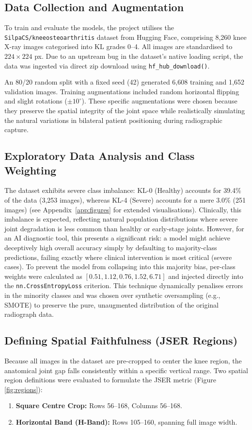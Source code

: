 \documentclass[conference]{IEEEtran}
\begin{document}
\subsection{Data Collection and Augmentation}
To train and evaluate the models, the project utilises the \texttt{SilpaCS/kneeosteoarthritis} \cite{silpacs} dataset from Hugging Face, comprising 8,260 knee X-ray images categorised into KL grades 0--4. All images are standardised to $224 \times 224$ px. Due to an upstream bug in the dataset's native loading script, the data was ingested via direct zip download using \texttt{hf\_hub\_download()}.

An 80/20 random split with a fixed seed (42) generated 6,608 training and 1,652 validation images. Training augmentations included random horizontal flipping and slight rotations ($\pm 10^{\circ}$). These specific augmentations were chosen because they preserve the spatial integrity of the joint space while realistically simulating the natural variations in bilateral patient positioning during radiographic capture.

\subsection{Exploratory Data Analysis and Class Weighting}
The dataset exhibits severe class imbalance: KL-0 (Healthy) accounts for 39.4\% of the data (3,253 images), whereas KL-4 (Severe) accounts for a mere 3.0\% (251 images) (see Appendix~\ref{app:figures} for extended visualisations). Clinically, this imbalance is expected, reflecting natural population distributions where severe joint degradation is less common than healthy or early-stage joints. However, for an AI diagnostic tool, this presents a significant risk: a model might achieve deceptively high overall accuracy simply by defaulting to majority-class predictions, failing exactly where clinical intervention is most critical (severe cases). To prevent the model from collapsing into this majority bias, per-class weights were calculated as $[0.51, 1.12, 0.76, 1.52, 6.71]$ and injected directly into the \texttt{nn.CrossEntropyLoss} criterion. This technique dynamically penalises errors in the minority classes and was chosen over synthetic oversampling (e.g., SMOTE) to preserve the pure, unaugmented distribution of the original radiograph data.

\subsection{Defining Spatial Faithfulness (JSER Regions)}
Because all images in the dataset are pre-cropped to center the knee region, the anatomical joint gap falls consistently within a specific vertical range. Two spatial region definitions were evaluated to formulate the JSER metric (Figure \ref{fig:regions}):
\begin{enumerate}
    \item \textbf{Square Centre Crop:} Rows 56--168, Columns 56--168.
    \item \textbf{Horizontal Band (H-Band):} Rows 105--160, spanning full image width.
\end{enumerate}
\end{document}
